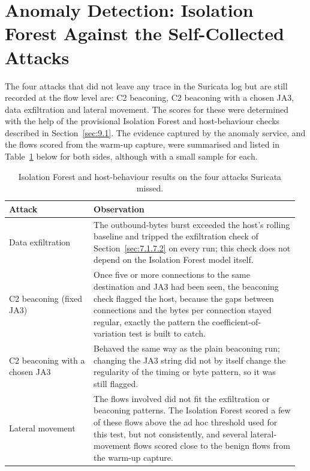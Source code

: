 \section{Anomaly Detection: Isolation Forest Against the Self-Collected Attacks}\label{sec:9.3}

\noindent The four attacks that did not leave any trace in the Suricata log but are still recorded at the flow level are: C2 beaconing, C2 beaconing with a chosen JA3, data exfiltration and lateral movement. The scores for these were determined with the help of the provisional Isolation Forest and host-behaviour checks described in Section~\ref{sec:9.1}. The evidence captured by the anomaly service, and the flows scored from the warm-up capture, were summarised and listed in Table~\ref{tab:ifresults} below for both sides, although with a small sample for each.

\begin{table}[H]
\centering
\caption{Isolation Forest and host-behaviour results on the four attacks Suricata missed.}\label{tab:ifresults}
\begin{tabular}{|>{\raggedright\arraybackslash}p{0.28\linewidth}|>{\raggedright\arraybackslash}p{0.68\linewidth}|}
\hline
\textbf{Attack} & \textbf{Observation} \\ \hline
Data exfiltration & The outbound-bytes burst exceeded the host's rolling baseline and tripped the exfiltration check of Section~\ref{sec:7.1.7.2} on every run; this check does not depend on the Isolation Forest model itself. \\ \hline
C2 beaconing (fixed JA3) & Once five or more connections to the same destination and JA3 had been seen, the beaconing check flagged the host, because the gaps between connections and the bytes per connection stayed regular, exactly the pattern the coefficient-of-variation test is built to catch. \\ \hline
C2 beaconing with a chosen JA3 & Behaved the same way as the plain beaconing run; changing the JA3 string did not by itself change the regularity of the timing or byte pattern, so it was still flagged. \\ \hline
Lateral movement & The flows involved did not fit the exfiltration or beaconing patterns. The Isolation Forest scored a few of these flows above the ad hoc threshold used for this test, but not consistently, and several lateral-movement flows scored close to the benign flows from the warm-up capture. \\ \hline
\end{tabular}
\end{table}

